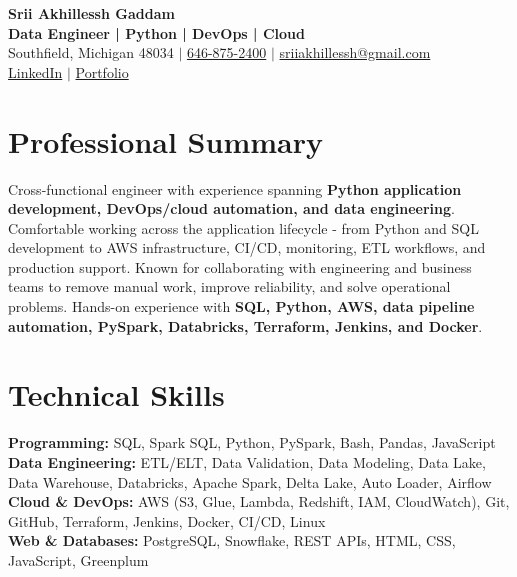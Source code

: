 \documentclass[letterpaper,10pt]{article}
\begin{document}
\fontsize{9.35pt}{10.45pt}\selectfont

\begin{center}
    {\LARGE \textbf{Srii Akhillessh Gaddam}} \\[-1pt]
    \textbf{Data Engineer | Python | DevOps | Cloud} \\[2pt]
    Southfield, Michigan 48034 $|$
    \href{tel:6468752400}{646-875-2400} $|$
    \href{mailto:sriiakhillessh@gmail.com}{sriiakhillessh@gmail.com} \\[1pt]
    \href{https://www.linkedin.com/in/srii-akhiilessh-gaddam-b48668191/}{LinkedIn} $|$
    \href{https://sriiakhillesshg.github.io/portfolio/}{Portfolio}
\end{center}
\vspace{-8pt}

\section{Professional Summary}
\small{Cross-functional engineer with experience spanning \textbf{Python application development, DevOps/cloud automation, and data engineering}. Comfortable working across the application lifecycle - from Python and SQL development to AWS infrastructure, CI/CD, monitoring, ETL workflows, and production support. Known for collaborating with engineering and business teams to remove manual work, improve reliability, and solve operational problems. Hands-on experience with \textbf{SQL, Python, AWS, data pipeline automation, PySpark, Databricks, Terraform, Jenkins, and Docker}.}

\section{Technical Skills}
\small{
\textbf{Programming:} SQL, Spark SQL, Python, PySpark, Bash, Pandas, JavaScript \\
\textbf{Data Engineering:} ETL/ELT, Data Validation, Data Modeling, Data Lake, Data Warehouse, Databricks, Apache Spark, Delta Lake, Auto Loader, Airflow \\
\textbf{Cloud \& DevOps:} AWS (S3, Glue, Lambda, Redshift, IAM, CloudWatch), Git, GitHub, Terraform, Jenkins, Docker, CI/CD, Linux \\
\textbf{Web \& Databases:} PostgreSQL, Snowflake, REST APIs, HTML, CSS, JavaScript, Greenplum
}
\end{document}
